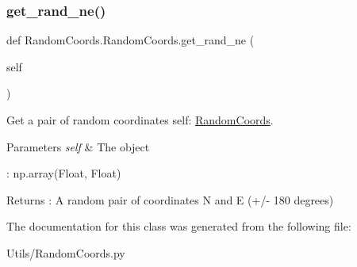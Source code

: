 \subsubsection{\texorpdfstring{get\+\_\+rand\+\_\+ne()}{get\_rand\_ne()}}
{\footnotesize\ttfamily def Random\+Coords.\+Random\+Coords.\+get\+\_\+rand\+\_\+ne (\begin{DoxyParamCaption}\item[{}]{self }\end{DoxyParamCaption})}



Get a pair of random coordinates  self\+: \hyperlink{classRandomCoords_1_1RandomCoords}{Random\+Coords}. 


\begin{DoxyParams}{Parameters}
{\em self} & The object\\
\hline
\end{DoxyParams}
\+: np.\+array(\+Float, Float) \begin{DoxyReturn}{Returns}
\+: A random pair of coordinates N and E (+/-\/ 180 degrees) 
\end{DoxyReturn}


The documentation for this class was generated from the following file\+:\begin{DoxyCompactItemize}
\item 
Utils/Random\+Coords.\+py\end{DoxyCompactItemize}
